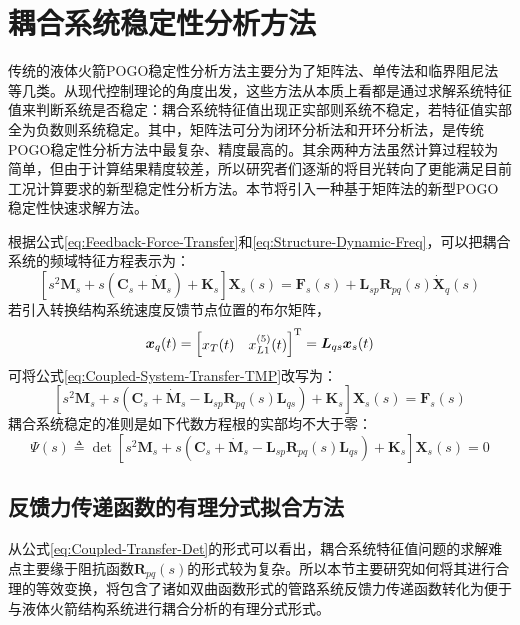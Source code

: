 \section{耦合系统稳定性分析方法}
传统的液体火箭POGO稳定性分析方法主要分为了矩阵法、单传法和临界阻尼法\cite{Wang-Qizheng:1999}等几类。从现代控制理论的角度出发\cite{Ogata:2009}，这些方法从本质上看都是通过求解系统特征值来判断系统是否稳定：耦合系统特征值出现正实部则系统不稳定，若特征值实部全为负数则系统稳定。其中，矩阵法可分为闭环分析法和开环分析法，是传统POGO稳定性分析方法中最复杂、精度最高的。其余两种方法虽然计算过程较为简单，但由于计算结果精度较差，所以研究者们逐渐的将目光转向了更能满足目前工况计算要求的新型稳定性分析方法。本节将引入一种基于矩阵法的新型POGO稳定性快速求解方法。

根据公式\eqref{eq:Feedback-Force-Transfer}和\eqref{eq:Structure-Dynamic-Freq}，可以把耦合系统的频域特征方程表示为：
\begin{equation}
	\label{eq:Coupled-System-Transfer-TMP}
	\left[s^2 \boldsymbol{M}_s+ s(\boldsymbol{C}_s+\boldsymbol{\dot{M}}_s)+ \boldsymbol{K}_s \right]\boldsymbol{X}_s(s)=\boldsymbol{F}_s(s)+ \boldsymbol{L}_{sp} \boldsymbol{R}_{pq}(s)\boldsymbol{\dot{X}}_q(s)
\end{equation}
若引入转换结构系统速度反馈节点位置的布尔矩阵，
\begin{displaymath}
	\boldsymbol{x}_q(t)=
	\left[ \begin{matrix}
		{x}_T(t) & {x}_{L1}^{(5)}(t)
	\end{matrix} \right]^{\mathrm{T}}=
	\boldsymbol{L}_{qs} \boldsymbol{x}_s(t)
\end{displaymath}
可将公式\eqref{eq:Coupled-System-Transfer-TMP}改写为：
\begin{equation}
	\label{eq:Coupled-System-Transfer}
	\left[s^2 \boldsymbol{M}_s+ s\left(\boldsymbol{C}_s+\boldsymbol{\dot{M}}_s
	-\boldsymbol{L}_{sp} \boldsymbol{R}_{pq}(s)\boldsymbol{L}_{qs}\right)+ \boldsymbol{K}_s \right]\boldsymbol{X}_s(s)=\boldsymbol{F}_s(s)
\end{equation}
耦合系统稳定的准则是如下代数方程根的实部均不大于零：
\begin{equation}
	\label{eq:Coupled-Transfer-Det}
	\Psi (s) \triangleq \det
	\left[s^2 \boldsymbol{M}_s+ s\left(\boldsymbol{C}_s+\boldsymbol{\dot{M}}_s
	-\boldsymbol{L}_{sp} \boldsymbol{R}_{pq}(s)\boldsymbol{L}_{qs}\right)+ \boldsymbol{K}_s \right]\boldsymbol{X}_s(s)=0
\end{equation}

\subsection{反馈力传递函数的有理分式拟合方法}
从公式\eqref{eq:Coupled-Transfer-Det}的形式可以看出，耦合系统特征值问题的求解难点主要缘于阻抗函数$\boldsymbol{R}_{pq}(s)$的形式较为复杂。所以本节主要研究如何将其进行合理的等效变换，将包含了诸如双曲函数形式的管路系统反馈力传递函数转化为便于与液体火箭结构系统进行耦合分析的有理分式形式。

